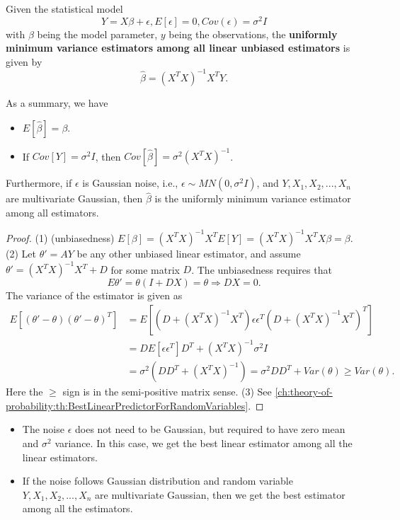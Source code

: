 \begin{refsection}
\begin{theorem}
	Given the statistical model
	$$Y= X\beta + \epsilon, E[\epsilon] = 0, Cov(\epsilon) = \sigma^2 I$$
	with $\beta$ being the model parameter, $y$ being the observations, the \textbf{uniformly minimum variance estimators among all linear unbiased estimators} is given by
	$$\hat{\beta} = (X^TX)^{-1}X^TY.$$
	
	As a summary, we have
	\begin{itemize}
		\item $E[\hat{\beta}] = \beta$.
		\item If $Cov[Y] = \sigma^2I$, then $Cov[\hat{\beta}] = \sigma^2(X^TX)^{-1}$.
	\end{itemize}

Furthermore, if $\epsilon$ is Gaussian noise, i.e., $\epsilon \sim MN(0, \sigma^2 I)$, and $Y,X_1,X_2,...,X_n$ are multivariate Gaussian, then $\hat{\beta}$ is the uniformly minimum variance estimator among all estimators.
\end{theorem}
\begin{proof}
	
	(1) (unbiasedness) $E[\beta] = (X^TX)^{-1}X^T E[Y] = (X^TX)^{-1}X^TX\beta = \beta.$
	(2) Let $\theta' = AY $ be any other unbiased linear estimator, and assume $\theta' = (X^TX)^{-1}X^T + D $ for some matrix $D$. The unbiasedness requires that $$E\theta' = \theta(I + DX) = \theta \Rightarrow DX = 0.$$
	The variance of the estimator is given as
	\begin{align*}
	E[(\theta' - \theta)(\theta' - \theta)^T] &= E[(D + (X^TX)^{-1}X^T)\epsilon\epsilon^T(D+(X^TX)^{-1}X^T)^T]\\
	&=DE[\epsilon\epsilon^T]D^T + (X^TX)^{-1} \sigma^2 I \\
	&=\sigma^2 (DD^T + (X^TX)^{-1}) = \sigma^2 DD^T + Var(\theta) \geq Var(\theta).
	\end{align*} 
	Here the $\geq$ sign is in the semi-positive matrix sense.  
	(3) See \autoref{ch:theory-of-probability:th:BestLinearPredictorForRandomVariables}.
\end{proof}

\begin{remark}\hfill
\begin{itemize}
	\item The noise $\epsilon$ does not need to be Gaussian, but required to have zero mean and $\sigma^2$ variance. In this case, we get the best linear estimator among all the linear estimators.
	\item If the noise follows Gaussian distribution and random variable $Y,X_1,X_2,...,X_n$ are multivariate Gaussian, then we get the best estimator among all the estimators.
\end{itemize}	
	

\end{remark}
\end{refsection}
